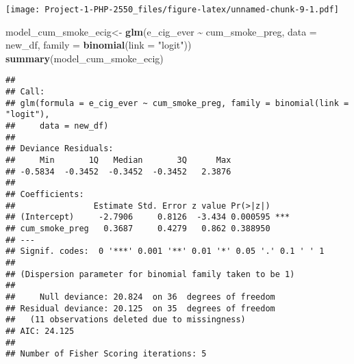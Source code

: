 \documentclass[
]{article}
\newenvironment{Shaded}{\begin{snugshade}}{\end{snugshade}}
\newcommand{\AttributeTok}[1]{\textcolor[rgb]{0.13,0.29,0.53}{#1}}
\newcommand{\CommentTok}[1]{\textcolor[rgb]{0.56,0.35,0.01}{\textit{#1}}}
\newcommand{\FunctionTok}[1]{\textcolor[rgb]{0.13,0.29,0.53}{\textbf{#1}}}
\newcommand{\NormalTok}[1]{#1}
\newcommand{\OtherTok}[1]{\textcolor[rgb]{0.56,0.35,0.01}{#1}}
\newcommand{\SpecialCharTok}[1]{\textcolor[rgb]{0.81,0.36,0.00}{\textbf{#1}}}
\newcommand{\StringTok}[1]{\textcolor[rgb]{0.31,0.60,0.02}{#1}}
\begin{document}
\begin{Shaded}
\end{Shaded}

\texttt{[image: Project-1-PHP-2550\_files/figure-latex/unnamed-chunk-9-1.pdf]}

\begin{Shaded}
\begin{Highlighting}[]
\NormalTok{model\_cum\_smoke\_ecig}\OtherTok{\textless{}{-}} \FunctionTok{glm}\NormalTok{(e\_cig\_ever }\SpecialCharTok{\textasciitilde{}}\NormalTok{ cum\_smoke\_preg, }\AttributeTok{data =}\NormalTok{ new\_df, }\AttributeTok{family =} \FunctionTok{binomial}\NormalTok{(}\AttributeTok{link =} \StringTok{"logit"}\NormalTok{))}
\FunctionTok{summary}\NormalTok{(model\_cum\_smoke\_ecig)}
\end{Highlighting}
\end{Shaded}

\begin{verbatim}
## 
## Call:
## glm(formula = e_cig_ever ~ cum_smoke_preg, family = binomial(link = "logit"), 
##     data = new_df)
## 
## Deviance Residuals: 
##     Min       1Q   Median       3Q      Max  
## -0.5834  -0.3452  -0.3452  -0.3452   2.3876  
## 
## Coefficients:
##                Estimate Std. Error z value Pr(>|z|)    
## (Intercept)     -2.7906     0.8126  -3.434 0.000595 ***
## cum_smoke_preg   0.3687     0.4279   0.862 0.388950    
## ---
## Signif. codes:  0 '***' 0.001 '**' 0.01 '*' 0.05 '.' 0.1 ' ' 1
## 
## (Dispersion parameter for binomial family taken to be 1)
## 
##     Null deviance: 20.824  on 36  degrees of freedom
## Residual deviance: 20.125  on 35  degrees of freedom
##   (11 observations deleted due to missingness)
## AIC: 24.125
## 
## Number of Fisher Scoring iterations: 5
\end{verbatim}
\end{document}
